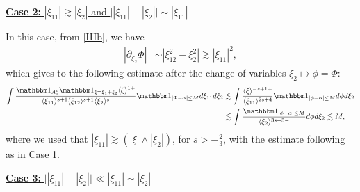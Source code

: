 \documentclass[%
11pt,  reqno]{amsart}
\newcommand{\5}{\textup{V}}
\newcommand{\noi}{\noindent}
\newcommand{\ind}{\mathbbm 1}
\newcommand{\les}{\lesssim}
\theoremstyle{remark}
\newcommand{\al}{\alpha}
\newcommand{\ges}{\gtrsim}
\newcommand{\jb}[1]
{\langle #1 \rangle}
\numberwithin{equation}{section}
\numberwithin{theorem}{section}
\begin{document}
\smallskip
\noi
\underline{\textbf{Case 2:} $|\xi_{11}| \ges |\xi_2|$ and $\big| |\xi_{11}| - |\xi_2| \big| \sim |\xi_{11}|$}

In this case, from \eqref{IIIb}, we have
\begin{align}
| 
\partial_{\xi_{2}} \Phi|
&
\sim |\xi_{12}^2 - \xi_2^2| \ges |\xi_{11}|^2,
\end{align}
which gives to the following estimate after the change of variables $\xi_{2} \mapsto \phi = \Phi$:
\begin{align}
\int \frac{\ind_{A_1^c} \ind_{\xi=\xi_1+\xi_2} \jb{\xi}^{ 1+}}{ \jb{\xi_{11}}^{s+1} \jb{\xi_{12}}^{s+1} \jb{\xi_2}^s}
\ind_{|\Phi - \al| \le M}
d\xi_{11} d\xi_2
&
\les \int \frac{\jb{\xi}^{ - s + 1 +} }{ \jb{\xi_{11}}^{2s+4}  } \ind_{|\phi - \al | \le M } d\phi d\xi_2
\\
&
\les \int \frac{\ind_{|\phi - \al|\le M }}{ \jb{\xi_2}^{3s + 3 -} } d\phi d\xi_2 \les M, 
\end{align}
where we used that $|\xi_{11}| \ges (|\xi| \land |\xi_2|)$, for $s>-\frac23$, with the estimate following as in Case 1. 



\smallskip

\noi
\underline{\textbf{Case 3:}  $\big| |\xi_{11}| - |\xi_2| \big| \ll |\xi_{11}| \sim |\xi_2|$}
\end{document}
